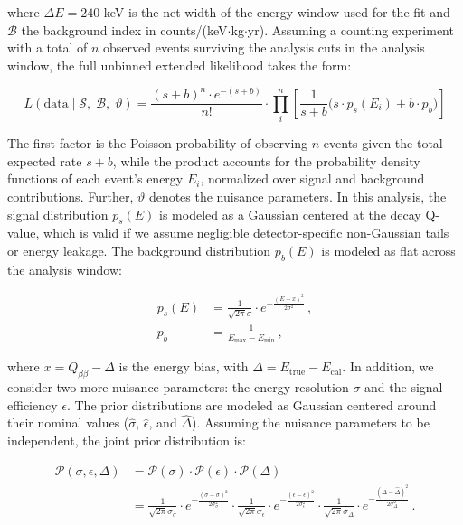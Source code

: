 \noindent where $\Delta E = 240$ keV is the net width of the energy window used for the fit and $\mathcal{B}$ the background index in counts/(keV$\cdot$kg$\cdot$yr). 
Assuming a counting experiment with a total of $n$ observed events surviving the analysis cuts in the analysis window, the full unbinned extended likelihood takes the form:

\begin{equation}
\label{eq:bayes_likelihood}
	L \left( \mathrm{data} \mid \mathcal{S}, \; \mathcal{B}, \; \vartheta \right) = \frac{(s+b)^n \cdot e^{-(s+b)}}{n!} \cdot \prod_i^n \left[ \frac{1}{s+b}  \Big( s \cdot p_s(E_i) + b \cdot p_b \Big)  \right]
\end{equation}

The first factor is the Poisson probability of observing $n$ events given the total expected rate $s + b$, while the product accounts for the probability density functions of each event's energy $E_i$, normalized over signal and background contributions. Further, $\vartheta$ denotes the nuisance parameters. In this analysis, the signal distribution $p_s(E)$ is modeled as a Gaussian centered at the decay Q-value, which is valid if we assume negligible detector-specific non-Gaussian tails or energy leakage. The background distribution $p_b(E)$ is modeled as flat across the analysis window: 

\begin{align}
\label{eq:bayes_sig_pdf}
	p_s(E) & = \frac{1}{\sqrt{2 \pi} \sigma} \cdot e^{-\frac{ \left(E - x\right)^2}{2 \sigma^2}} \,,\\
	p_b & = \frac{1}{E_{\mathrm{max}} - E_{\mathrm{min}}}   \,,
\label{eq:bayes_bkg_pdf}
\end{align}

\noindent where $x = Q_{\beta \beta} - \Delta$ is the energy bias, with $\Delta = E_{\mathrm{true}} - E_{\mathrm{cal}}$. In addition, we consider two more nuisance parameters: the energy resolution $\sigma$ and the signal efficiency $\epsilon$. The prior distributions are modeled as Gaussian centered around their nominal values ($\hat{\sigma}$, $\hat{\epsilon}$, and $\hat{\Delta}$). Assuming the nuisance parameters to be independent, the joint prior distribution is:

\begin{align}
\label{eq:bayes_nuisance_parm}
	\mathcal{P}( \sigma, \epsilon, \Delta ) & = \mathcal{P}(\sigma) \cdot \mathcal{P}(\epsilon) \cdot \mathcal{P}(\Delta) \\
    & = 
	\frac{1}{\sqrt{2 \pi} \sigma_{\sigma}} \cdot e^{-\frac{\left( \sigma - \hat{\sigma} \right)^2}{2 \sigma_{\sigma}^2}} \cdot 
	\frac{1}{\sqrt{2 \pi} \sigma_{\epsilon}} \cdot e^{-\frac{\left( \epsilon - \hat{\epsilon} \right)^2}{2 \sigma_{\epsilon}^2}}  \cdot
    \frac{1}{\sqrt{2 \pi} \sigma_{\Delta}} \cdot e^{-\frac{\left( \Delta - \hat{\Delta} \right)^2}{2 \sigma_{\Delta}^2}}  \nonumber \,.
\end{align}

